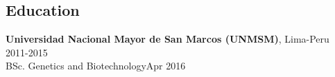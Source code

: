 \documentclass[margin,line]{res}
\begin{document}
\begin{resume}


\section{\sc Education}
{\bf Universidad Nacional Mayor de San Marcos (UNMSM)}, Lima-Peru \hfill 2011-2015\\%
BSc. Genetics and Biotechnology\hfill Apr 2016\\




\end{resume}
\end{document}
